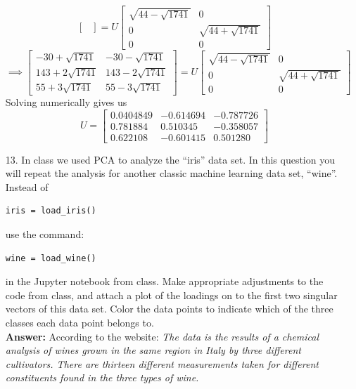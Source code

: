 \documentclass{article}
\begin{document}
\begin{itemize}
\[\begin{bmatrix}
                  \end{bmatrix}=U\begin{bmatrix}
                        \sqrt{44-\sqrt{1741}} & 0 \\ 0 & \sqrt{44+\sqrt{1741}} \\ 0 & 0
                  \end{bmatrix}
            \]\[
                  \implies\begin{bmatrix}
                        -30+\sqrt{1741}  & -30-\sqrt{1741}  \\
                        143+2\sqrt{1741} & 143-2\sqrt{1741} \\
                        55+3\sqrt{1741}  & 55-3\sqrt{1741}
                  \end{bmatrix}=U\begin{bmatrix}
                        \sqrt{44-\sqrt{1741}} & 0 \\ 0 & \sqrt{44+\sqrt{1741}} \\ 0 & 0
                  \end{bmatrix}
            \]
            Solving numerically gives us
            \[
                  \boxed{U=\begin{bmatrix}
                              0.0404849 & -0.614694 & -0.787726 \\
                              0.781884  & 0.510345  & -0.358057 \\
                              0.622108  & -0.601415 & 0.501280
                        \end{bmatrix}}
            \]
      \item [13.] In class we used PCA to analyze the ``iris'' data set. In this question you will repeat the analysis for another classic machine learning data set, ``wine''. Instead of \begin{verbatim}iris = load_iris()\end{verbatim} use the command:\begin{verbatim}wine = load_wine()\end{verbatim} in the Jupyter notebook from class. Make appropriate adjustments to the code from class, and attach a plot of the loadings on to the first two singular vectors of this data set. Color the data points to indicate which of the three classes each data point belongs to.\\
            \textbf{Answer:} According to the website: \textit{The data is the results of a chemical analysis of wines grown in the same region in Italy by three different cultivators. There are thirteen different measurements taken for different constituents found in the three types of wine.}

\end{itemize}
\end{document}
